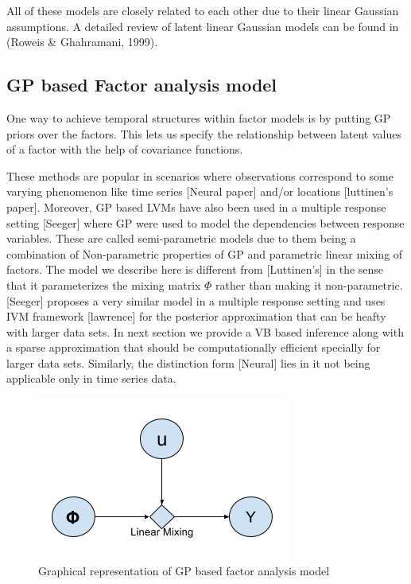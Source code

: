 All of these models are closely related to each other due to their linear Gaussian assumptions. A detailed review of latent linear Gaussian models can be found in (Roweis \& Ghahramani, 1999).

\subsection{GP based Factor analysis model}

One way to achieve temporal structures within factor models is by putting GP priors over the factors. This lets us specify the relationship between latent values of a factor with the help of covariance functions.

These methods are popular in scenarios where observations correspond to some varying phenomenon like time series [Neural paper] and/or locations [luttinen’s paper]. Moreover, GP based LVMs have also been used in a multiple response setting [Seeger] where GP were used to model the dependencies between response variables. These are called semi-parametric models due to them being a combination of Non-parametric properties of GP and parametric linear mixing of factors. 
The model we describe here is different from [Luttinen’s] in the sense that it parameterizes the mixing matrix $\Phi$ rather than making it non-parametric. [Seeger] proposes a very similar model in a multiple response setting and uses IVM framework [lawrence] for the posterior approximation that can be heafty with larger data sets. In next section we provide a VB based inference along with a sparse approximation that should be computationally efficient specially for larger data sets. Similarly, the distinction form [Neural] lies in it not being applicable only in time series data. 
\begin{figure}
    \centering
    \includegraphics[scale=0.5]{images/GPFA_graphical_model.png}
    \caption{Graphical representation of GP based factor analysis model}
    \label{fig:gpfa_graph}
\end{figure}

